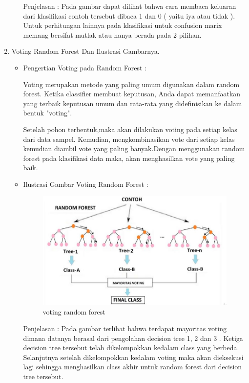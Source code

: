 \begin{enumerate}
\begin{itemize}
\par
\par Penjelasan : Pada gambar dapat dilihat bahwa cara membaca keluaran dari klasifikasi contoh tersebut dibaca 1 dan 0 ( yaitu iya atau tidak ). Untuk perhitungan lainnya pada klasifikasi untuk confusion marix memang bersifat mutlak atau hanya berada pada 2 pilihan.
\par
\par 
\end{itemize}

\par
\par
\item Voting Random Forest Dan Ilustrasi Gambarnya.
\par
\begin{itemize}
\item Pengertian Voting pada Random Forest	:
\par Voting merupakan metode yang paling umum digunakan dalam random forest. Ketika classifier membuat keputusan, Anda dapat memanfaatkan yang terbaik keputusan umum dan rata-rata yang didefinisikan ke dalam bentuk "voting".
\par Setelah pohon terbentuk,maka akan dilakukan voting pada setiap kelas dari data sampel. Kemudian, mengkombinasikan vote dari setiap kelas kemudian diambil vote yang paling banyak.Dengan menggunakan random forest pada klasifikasi data maka, akan menghasilkan vote yang paling baik.
\item Ilustrasi Gambar Voting Random Forest :
\begin{figure}[ht]
\centering
\includegraphics[scale=0.3]{figures/voting.jpg}
\caption{voting random forest}
\label{contoh}
\end{figure}
\par 
\par Penjelasan : Pada gambar terlihat bahwa terdapat mayoritas voting dimana datanya berasal dari pengolahan decision tree 1, 2 dan 3 . Ketiga decision tree tersebut telah dikelompokkan kedalam class yang berbeda. Selanjutnya setelah dikelompokkan kedalam voting maka akan dieksekusi lagi sehingga menghasilkan class akhir untuk random forest dari decision tree tersebut. 
\par
\end{itemize}
\par

\end{enumerate}
